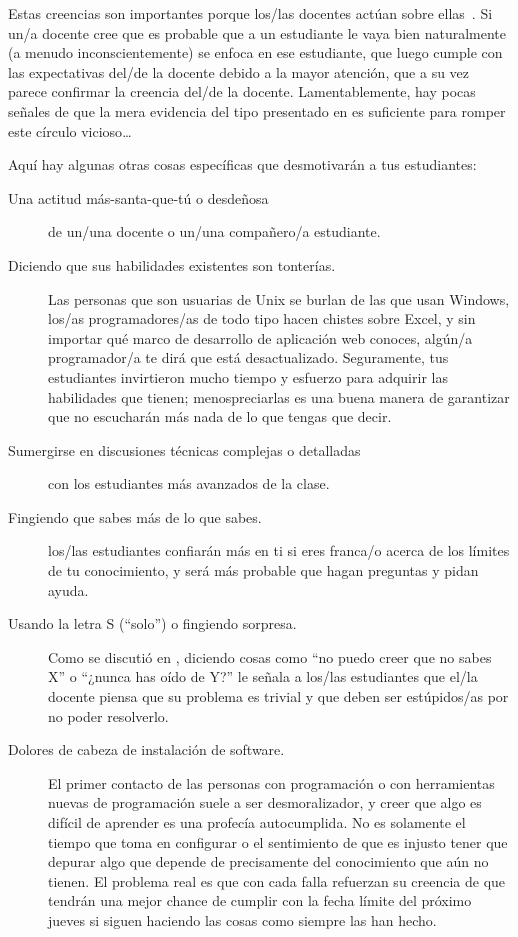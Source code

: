 Estas creencias son importantes porque los/las docentes actúan sobre ellas~\cite{Brop1983}.
Si un/a docente cree que es probable que a un estudiante le vaya bien
naturalmente (a menudo inconscientemente) se enfoca en ese estudiante,
que luego cumple con las expectativas del/de la docente debido a la mayor atención,
que a su vez parece confirmar la creencia del/de la docente.
Lamentablemente,
hay pocas señales de que la mera evidencia del tipo presentado en \cite{Pati2016}
es suficiente para romper este círculo vicioso{\ldots}

Aquí hay algunas otras cosas específicas que desmotivarán a tus estudiantes:

\begin{description}

\item[Una actitud más-santa-que-tú o desdeñosa]
  de un/una docente o un/una compañero/a estudiante.

\item[Diciendo que sus habilidades existentes son tonterías.]
  Las personas que son usuarias de Unix se burlan de las que usan Windows,
  los/as programadores/as de todo tipo hacen chistes sobre Excel,
  y sin importar qué marco de desarrollo de aplicación web conoces,
  algún/a programador/a te dirá que está desactualizado.
  Seguramente, tus estudiantes invirtieron mucho tiempo y esfuerzo para adquirir las habilidades que tienen;
  menospreciarlas es una buena manera de garantizar que
  no escucharán más nada de lo que tengas que decir.

\item[Sumergirse en discusiones técnicas complejas o detalladas]
  con los estudiantes más avanzados de la clase.

\item[Fingiendo que sabes más de lo que sabes.]
  los/las estudiantes confiarán más en ti si eres franca/o acerca de los límites de tu conocimiento,
  y será más probable que hagan preguntas y pidan ayuda.

\item[Usando la letra S (``solo'') o fingiendo sorpresa.]
  Como se discutió en ,
  diciendo cosas como ``no puedo creer que no sabes X'' o ``¿nunca has oído de Y?''
  le señala a los/las estudiantes que
  el/la docente piensa que su problema es trivial
  y que deben ser estúpidos/as por no poder resolverlo.

\item[Dolores de cabeza de instalación de software.]
  El primer contacto de las personas con programación o con herramientas nuevas de programación suele a ser desmoralizador,
  y creer que algo es difícil de aprender es una profecía autocumplida.
  No es solamente el tiempo que toma en configurar
  o el sentimiento de que es injusto tener que depurar algo que depende de
  precisamente del conocimiento que aún no tienen.
    El problema real es que con cada falla refuerzan su creencia de que
  tendrán una mejor chance de cumplir con la fecha límite del próximo jueves
  si siguen haciendo las cosas como siempre las han hecho.

\end{description}

